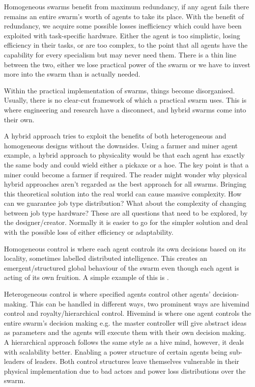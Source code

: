 \documentclass{UoYCSproject}
\begin{document}
Homogeneous swarms benefit from maximum redundancy, if any agent fails there remains an entire swarm's worth of agents to take its place.
With the benefit of redundancy, we acquire some possible losses inefficiency which could have been exploited with task-specific hardware.
Either the agent is too simplistic, losing efficiency in their tasks, or are too complex, to the point that all agents have the capability for every specialism but may never need them.
There is a thin line between the two, either we lose practical power of the swarm or we have to invest more into the swarm than is actually needed.

Within the practical implementation of swarms, things become disorganised.
Usually, there is no clear-cut framework of which a practical swarm uses.
This is where engineering and research have a disconnect, and hybrid swarms come into their own.

A hybrid approach tries to exploit the benefits of both heterogeneous and homogeneous designs without the downsides.
Using a farmer and miner agent example, a hybrid approach to physicality would be that each agent has exactly the same body and could wield either a pickaxe or a hoe. The key point is that a miner could become a farmer if required.
The reader might wonder why physical hybrid approaches aren’t regarded as the best approach for all swarms.
Bringing this theoretical solution into the real world can cause massive complexity.
How can we guarantee job type distribution?
What about the complexity of changing between job type hardware?
These are all questions that need to be explored, by the designer/creator.
Normally it is easier to go for the simpler solution and deal with the possible loss of either efficiency or adaptability.

Homogeneous control is where each agent controls its own decisions based on its locality, sometimes labelled distributed intelligence.
This creates an emergent/structured global behaviour of the swarm even though each agent is acting of its own fruition.
A simple example of this is \cite{Boids}.

Heterogeneous control is where specified agents control other agents' decision-making.
This can be handled in different ways, two prominent ways are hivemind control \cite{HiveMind} and royalty/hierarchical control.
Hivemind is where one agent controls the entire swarm's decision making e.g. the master controller will give abstract ideas as parameters and the agents will execute them with their own decision making.
A hierarchical approach follows the same style as a hive mind, however, it deals with scalability better.
Enabling a power structure of certain agents being sub-leaders of leaders.
Both control structures leave themselves vulnerable in their physical implementation due to bad actors and power loss distributions over the swarm.
\end{document}
